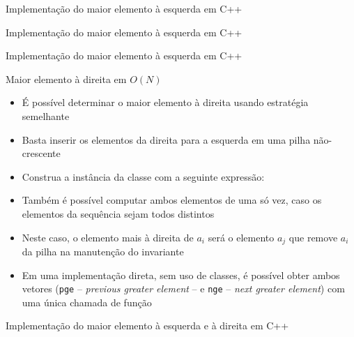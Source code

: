 \begin{frame}[fragile]{Implementação do maior elemento à esquerda em C++}
\end{frame}

\begin{frame}[fragile]{Implementação do maior elemento à esquerda em C++}
\end{frame}

\begin{frame}[fragile]{Implementação do maior elemento à esquerda em C++}
\end{frame}

\begin{frame}[fragile]{Maior elemento à direita em $O(N)$}

    \begin{itemize}
        \item É possível determinar o maior elemento à direita usando estratégia semelhante

        \item Basta inserir os elementos da direita para a esquerda em uma pilha não-crescente

        \item Construa a instância da classe  com a seguinte expressão:


        \item Também é possível computar ambos elementos de uma só vez, caso os elementos da sequência
            sejam todos distintos

        \item Neste caso, o elemento mais à direita de
            $a_i$ será o elemento $a_j$ que remove $a_i$ da pilha na manutenção do invariante

        \item Em uma implementação direta, sem uso de classes, é possível obter ambos vetores
            (\texttt{pge} -- \textit{previous greater element} -- e \texttt{nge} -- \textit{next
            greater element}) com uma única chamada de função
    \end{itemize}
\end{frame}

\begin{frame}[fragile]{Implementação do maior elemento à esquerda e à direita em C++}
\end{frame}


